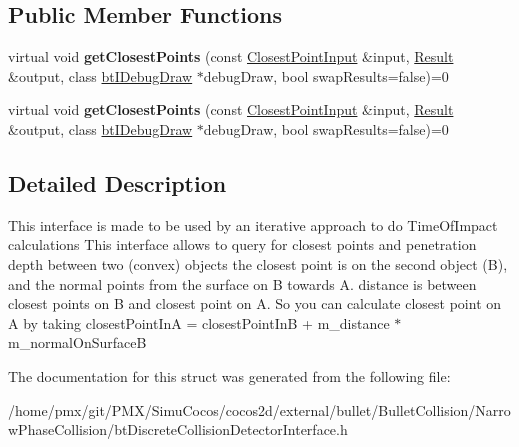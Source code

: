 \subsection*{Public Member Functions}
\begin{DoxyCompactItemize}
\item 
\mbox{\label{structbtDiscreteCollisionDetectorInterface_af749c5b0731c32d086a0a42e17c38b73}} 
virtual void {\bfseries get\+Closest\+Points} (const \hyperlink{structbtDiscreteCollisionDetectorInterface_1_1ClosestPointInput}{Closest\+Point\+Input} \&input, \hyperlink{structbtDiscreteCollisionDetectorInterface_1_1Result}{Result} \&output, class \hyperlink{classbtIDebugDraw}{bt\+I\+Debug\+Draw} $\ast$debug\+Draw, bool swap\+Results=false)=0
\item 
\mbox{\label{structbtDiscreteCollisionDetectorInterface_af749c5b0731c32d086a0a42e17c38b73}} 
virtual void {\bfseries get\+Closest\+Points} (const \hyperlink{structbtDiscreteCollisionDetectorInterface_1_1ClosestPointInput}{Closest\+Point\+Input} \&input, \hyperlink{structbtDiscreteCollisionDetectorInterface_1_1Result}{Result} \&output, class \hyperlink{classbtIDebugDraw}{bt\+I\+Debug\+Draw} $\ast$debug\+Draw, bool swap\+Results=false)=0
\end{DoxyCompactItemize}


\subsection{Detailed Description}
This interface is made to be used by an iterative approach to do Time\+Of\+Impact calculations This interface allows to query for closest points and penetration depth between two (convex) objects the closest point is on the second object (B), and the normal points from the surface on B towards A. distance is between closest points on B and closest point on A. So you can calculate closest point on A by taking closest\+Point\+InA = closest\+Point\+InB + m\+\_\+distance $\ast$ m\+\_\+normal\+On\+SurfaceB 

The documentation for this struct was generated from the following file\+:\begin{DoxyCompactItemize}
\item 
/home/pmx/git/\+P\+M\+X/\+Simu\+Cocos/cocos2d/external/bullet/\+Bullet\+Collision/\+Narrow\+Phase\+Collision/bt\+Discrete\+Collision\+Detector\+Interface.\+h\end{DoxyCompactItemize}
